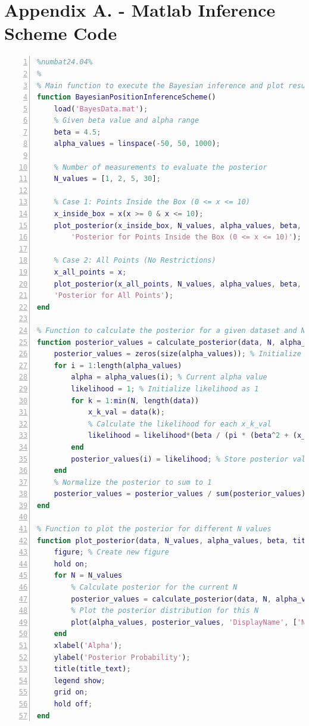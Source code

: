 \documentclass[a4paper,11pt]{article}
\begin{document}



\newpage
\appendix

\makeatother
\section{Appendix A. - Matlab Inference Scheme Code}
\begin{lstlisting}[language=Matlab,
                   numbers=left,
                   basicstyle=\footnotesize,
                   stepnumber=1,
                   numbersep=10pt,
                   tabsize=2,
                   showspaces=false,
                   showstringspaces=false]
%%%%%%%%%Bayesian Position Inference Scheme%%%%%%%%%%%%
%numbat24.04%
%
% Main function to execute the Bayesian inference and plot results
function BayesianPositionInferenceScheme()
    load('BayesData.mat');
    % Given beta value and alpha range
    beta = 4.5;
    alpha_values = linspace(-50, 50, 1000);

    % Number of measurements to evaluate the posterior
    N_values = [1, 2, 5, 30];

    % Case 1: Points Inside the Box (0 <= x <= 10)
    x_inside_box = x(x >= 0 & x <= 10);
    plot_posterior(x_inside_box, N_values, alpha_values, beta, ...
        'Posterior for Points Inside the Box (0 <= x <= 10)');

    % Case 2: All Points (No Restrictions)
    x_all_points = x; 
    plot_posterior(x_all_points, N_values, alpha_values, beta, 
    'Posterior for All Points');
end

% Function to calculate the posterior for a given dataset and N points
function posterior_values = calculate_posterior(data, N, alpha_values, beta)
    posterior_values = zeros(size(alpha_values)); % Initialize posterior array
    for i = 1:length(alpha_values)
        alpha = alpha_values(i); % Current alpha value
        likelihood = 1; % Initialize likelihood as 1
        for k = 1:min(N, length(data))
            x_k_val = data(k);
            % Calculate the likelihood for each x_k_val
            likelihood = likelihood*(beta / (pi * (beta^2 + (x_k_val - alpha)^2)));
        end
        posterior_values(i) = likelihood; % Store posterior value
    end
    % Normalize the posterior to sum to 1
    posterior_values = posterior_values / sum(posterior_values);
end

% Function to plot the posterior for different N values
function plot_posterior(data, N_values, alpha_values, beta, title_text)
    figure; % Create new figure
    hold on;
    for N = N_values
        % Calculate posterior for the current N
        posterior_values = calculate_posterior(data, N, alpha_values, beta);
        % Plot the posterior distribution for this N
        plot(alpha_values, posterior_values, 'DisplayName', ['N = ', num2str(N)]);
    end
    xlabel('Alpha');
    ylabel('Posterior Probability');
    title(title_text);
    legend show;
    grid on;
    hold off;
end
\end{lstlisting}
\end{document}
